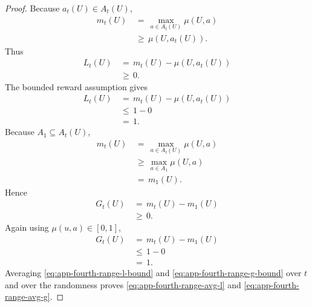 \documentclass{article} %
\begin{document}
\begin{proof}
Because \(a_t(U)\in A_t(U)\),
\begin{align}
\label{eq:app-fourth-range-proof-l-nonneg}
m_t(U)
&\,=\,
\max_{a\in A_t(U)}\mu(U,a)
\\
&\,\ge\,
\mu(U,a_t(U)).
\end{align}
Thus
\begin{align}
\label{eq:app-fourth-range-proof-l-lower}
L_t(U)
&\,=\,
m_t(U)-\mu(U,a_t(U))
\\
&\,\ge\,
0.
\end{align}
The bounded reward assumption gives
\begin{align}
\label{eq:app-fourth-range-proof-l-upper}
L_t(U)
&\,=\,
m_t(U)-\mu(U,a_t(U))
\\
&\,\le\,
1-0
\\
&\,=\,
1.
\end{align}
Because \(A_1\subseteq A_t(U)\),
\begin{align}
\label{eq:app-fourth-range-proof-g-nonneg}
m_t(U)
&\,=\,
\max_{a\in A_t(U)}\mu(U,a)
\\
&\,\ge\,
\max_{a\in A_1}\mu(U,a)
\\
&\,=\,
m_1(U).
\end{align}
Hence
\begin{align}
\label{eq:app-fourth-range-proof-g-lower}
G_t(U)
&\,=\,
m_t(U)-m_1(U)
\\
&\,\ge\,
0.
\end{align}
Again using \(\mu(u,a)\in[0,1]\),
\begin{align}
\label{eq:app-fourth-range-proof-g-upper}
G_t(U)
&\,=\,
m_t(U)-m_1(U)
\\
&\,\le\,
1-0
\\
&\,=\,
1.
\end{align}
Averaging \eqref{eq:app-fourth-range-l-bound} and \eqref{eq:app-fourth-range-g-bound} over \(t\) and over the randomness proves \eqref{eq:app-fourth-range-avg-l} and \eqref{eq:app-fourth-range-avg-g}.
\end{proof}
\end{document}
